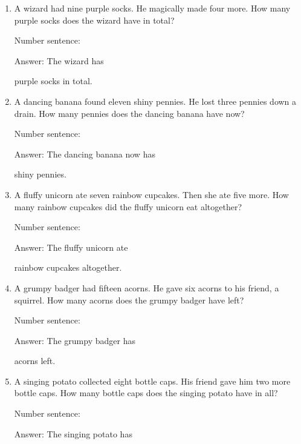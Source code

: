 \documentclass{tufte-book}
\begin{document}
\begin{enumerate}

\item
  A wizard had nine purple socks. He magically made four more. How many
  purple socks does the wizard have in total?\medskip\par
  Number sentence:
  \dotfill\medskip\par
  Answer: The wizard has
  \dotfill\medskip\par\mbox{}\dotfill\medskip\par\mbox{}\dotfill\bigskip
  purple socks in total.
\item
  A dancing banana found eleven shiny pennies. He lost three pennies
  down a drain. How many pennies does the dancing banana have now?\medskip\par
  Number sentence:
  \dotfill\medskip\par
  Answer: The dancing banana now has
  \dotfill\medskip\par\mbox{}\dotfill\medskip\par\mbox{}\dotfill\bigskip
  shiny pennies.
\item
  A fluffy unicorn ate seven rainbow cupcakes. Then she ate five more.
  How many rainbow cupcakes did the fluffy unicorn eat altogether?\medskip\par
  Number sentence:
  \dotfill\medskip\par
  Answer: The fluffy unicorn ate
  \dotfill\medskip\par\mbox{}\dotfill\medskip\par\mbox{}\dotfill\bigskip
  rainbow cupcakes altogether.
\item
  A grumpy badger had fifteen acorns. He gave six acorns to his friend,
  a squirrel. How many acorns does the grumpy badger have left?\medskip\par
  Number sentence:
  \dotfill\medskip\par
  Answer: The grumpy badger has
  \dotfill\medskip\par\mbox{}\dotfill\medskip\par\mbox{}\dotfill\bigskip
  acorns left.
\item
  A singing potato collected eight bottle caps. His friend gave him two
  more bottle caps. How many bottle caps does the singing potato have in
  all?\medskip\par
  Number sentence:
  \dotfill\medskip\par
  Answer: The singing potato has
  \dotfill\medskip\par\mbox{}\dotfill\medskip\par\mbox{}\dotfill\bigskip

\end{enumerate}
\end{document}
